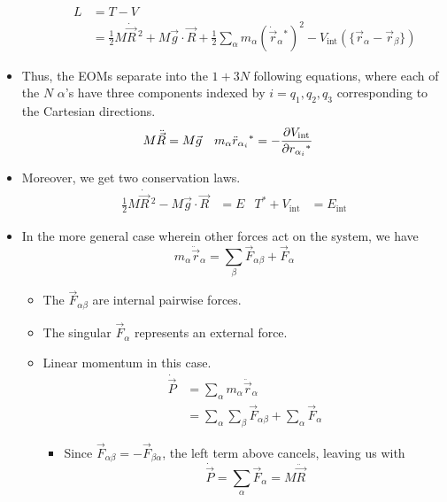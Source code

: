 \documentclass[../notes.tex]{subfiles}
\begin{document}
\begin{itemize}
\begin{itemize}
\begin{align*}
            L &= T-V\\
            &= \frac{1}{2}M\dot{\vec{R}}{\,}^2+M\vec{g}\cdot\vec{R}+\frac{1}{2}\sum_\alpha m_\alpha(\dot{\vec{r}}_\alpha{}^*)^2-V_\text{int}(\{\vec{r}_\alpha-\vec{r}_\beta\})
        \end{align*}
    \end{itemize}
    \item Thus, the EOMs separate into the $1+3N$ following equations, where each of the $N$ $\alpha$'s have three components indexed by $i=q_1,q_2,q_3$ corresponding to the Cartesian directions.
    \begin{align*}
        M\ddot{\vec{R}} &= M\vec{g}&
        m_\alpha\ddot{r}_{\alpha_i}{}^* &= -\pdv{V_\text{int}}{r_{\alpha_i}{}^*}
    \end{align*}
    \item Moreover, we get two conservation laws.
    \begin{align*}
        \frac{1}{2}M\dot{\vec{R}}{\,}^2-M\vec{g}\cdot\vec{R} &= E&
        T^*+V_\text{int} &= E_\text{int}
    \end{align*}
    \item In the more general case wherein other forces act on the system, we have
    \begin{equation*}
        m_\alpha\ddot{\vec{r}}_\alpha = \sum_\beta\vec{F}_{\alpha\beta}+\vec{F}_\alpha
    \end{equation*}
    \begin{itemize}
        \item The $\vec{F}_{\alpha\beta}$ are internal pairwise forces.
        \item The singular $\vec{F}_\alpha$ represents an external force.
        \item Linear momentum in this case.
        \begin{align*}
            \dot{\vec{P}} &= \sum_\alpha m_\alpha\ddot{\vec{r}}_\alpha\\
            &= \sum_\alpha\sum_\beta\vec{F}_{\alpha\beta}+\sum_\alpha\vec{F}_\alpha
        \end{align*}
        \begin{itemize}
            \item Since $\vec{F}_{\alpha\beta}=-\vec{F}_{\beta\alpha}$, the left term above cancels, leaving us with
            \begin{equation*}
                \dot{\vec{P}} = \sum_\alpha\vec{F}_\alpha
                = M\ddot{\vec{R}}
            \end{equation*}

\end{itemize}
\end{itemize}
\end{itemize}
\end{document}

